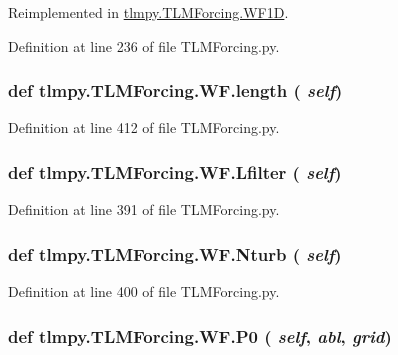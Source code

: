 Reimplemented in \hyperlink{classtlmpy_1_1TLMForcing_1_1WF1D_ad5a25d373ed339448293eee5b2845d4d}{tlmpy.TLMForcing.WF1D}.

Definition at line 236 of file TLMForcing.py.\hypertarget{classtlmpy_1_1TLMForcing_1_1WF_ae0772c24f6c9bc4d3219e3e9a2381c2a}{
\subsubsection[{length}]{\setlength{\rightskip}{0pt plus 5cm}def tlmpy.TLMForcing.WF.length ( {\em self})}}
\label{classtlmpy_1_1TLMForcing_1_1WF_ae0772c24f6c9bc4d3219e3e9a2381c2a}


Definition at line 412 of file TLMForcing.py.\hypertarget{classtlmpy_1_1TLMForcing_1_1WF_ae189822d9c443813168a65f5a2f0ecd9}{
\subsubsection[{Lfilter}]{\setlength{\rightskip}{0pt plus 5cm}def tlmpy.TLMForcing.WF.Lfilter ( {\em self})}}
\label{classtlmpy_1_1TLMForcing_1_1WF_ae189822d9c443813168a65f5a2f0ecd9}


Definition at line 391 of file TLMForcing.py.\hypertarget{classtlmpy_1_1TLMForcing_1_1WF_a7768bf66115d54e36ea0e0a81ca55aca}{
\subsubsection[{Nturb}]{\setlength{\rightskip}{0pt plus 5cm}def tlmpy.TLMForcing.WF.Nturb ( {\em self})}}
\label{classtlmpy_1_1TLMForcing_1_1WF_a7768bf66115d54e36ea0e0a81ca55aca}


Definition at line 400 of file TLMForcing.py.\hypertarget{classtlmpy_1_1TLMForcing_1_1WF_a4a922753d80666d37aa0e7f66551e1fe}{
\subsubsection[{P0}]{\setlength{\rightskip}{0pt plus 5cm}def tlmpy.TLMForcing.WF.P0 ( {\em self}, \/   {\em abl}, \/   {\em grid})}}
\label{classtlmpy_1_1TLMForcing_1_1WF_a4a922753d80666d37aa0e7f66551e1fe}


